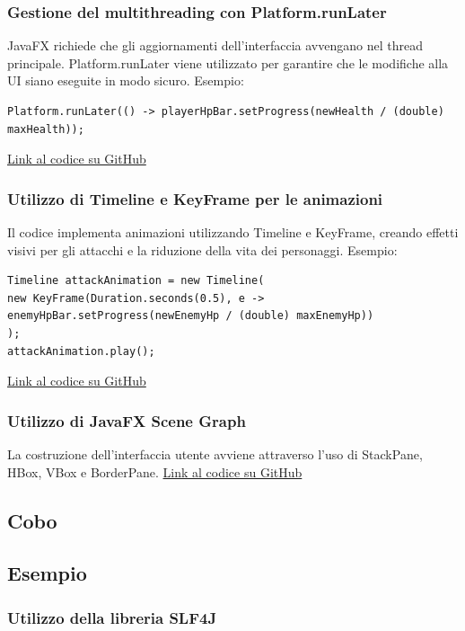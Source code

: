 \documentclass[a4paper,12pt]{report}
\begin{document}
\subsubsection{Gestione del multithreading con Platform.runLater}
JavaFX richiede che gli aggiornamenti dell'interfaccia avvengano nel thread principale. Platform.runLater viene utilizzato per garantire che le modifiche alla UI siano eseguite in modo sicuro.\newline
Esempio:
\begin{verbatim}
Platform.runLater(() -> playerHpBar.setProgress(newHealth / (double) maxHealth));
\end{verbatim}
\href{https://github.com/}{Link al codice su GitHub}

\subsubsection{Utilizzo di Timeline e KeyFrame per le animazioni}
Il codice implementa animazioni utilizzando Timeline e KeyFrame, creando effetti visivi per gli attacchi e la riduzione della vita dei personaggi.\newline
Esempio:
\begin{verbatim}
Timeline attackAnimation = new Timeline(
new KeyFrame(Duration.seconds(0.5), e -> enemyHpBar.setProgress(newEnemyHp / (double) maxEnemyHp))
);
attackAnimation.play();
\end{verbatim}
\href{https://github.com/}{Link al codice su GitHub}

\subsubsection{Utilizzo di JavaFX Scene Graph}
La costruzione dell'interfaccia utente avviene attraverso l'uso di StackPane, HBox, VBox e BorderPane.\newline
\href{https://github.com/}{Link al codice su GitHub}
\subsection{Cobo}

\subsection{Esempio}

\subsubsection{Utilizzo della libreria SLF4J}
\end{document}
